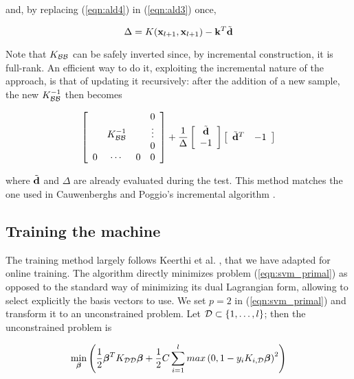 \noindent and, by replacing (\ref{eqn:ald4}) in (\ref{eqn:ald3}) once,

\begin{equation} \label{eqn:ald5}
  \Delta = K(\mathbf{x}_{l+1},\mathbf{x}_{l+1}) - \mathbf{k}^T \tilde{\mathbf{d}}
\end{equation}

Note that $K_{\mathcal{B}\mathcal{B}}$ can be safely inverted since, by incremental
construction, it is full-rank. An efficient way to do it, exploiting
the incremental nature of the approach, is that of updating it
recursively: after the addition of a new sample, the new
$K_{\mathcal{B}\mathcal{B}}^{-1}$ then becomes

\begin{equation} \label{eqn:inv_upd}
  \left[\begin{array}{cccc}
       &               &   & 0 \\
       & K_{\mathcal{B}\mathcal{B}}^{-1} &   & \vdots \\
       &               &   & 0 \\
     0 &       \cdots  & 0 & 0
  \end{array}\right]
  +
  \frac{1}{\Delta}
  \left[\begin{array}{c}
    \tilde{\mathbf{d}} \\
    -1
  \end{array}\right]
  \left[\begin{array}{cc}
    \tilde{\mathbf{d}}^T & -1
  \end{array}\right]
\end{equation}

\noindent where $\tilde{\mathbf{d}}$ and $\Delta$ are already evaluated during the
test. This method matches the one used in Cauwenberghs and Poggio's
incremental algorithm \cite{CauwenberghsP00}.

\subsection{Training the machine}

The training method largely follows Keerthi et
al. \cite{KeerthiDC05,KeerthiCDC06}, that we have adapted for online
training. The algorithm directly minimizes problem
(\ref{eqn:svm_primal}) as opposed to the standard way of minimizing
its dual Lagrangian form, allowing to select explicitly the basis
vectors to use. We set $p=2$ in (\ref{eqn:svm_primal}) and transform
it to an unconstrained problem.  Let $\mathcal{D} \subset \{1,\ldots,l\}$; then
the unconstrained problem is

\begin{equation} \label{eqn:primal}
  \min_{\boldsymbol{\beta}} \left( 
      \frac{1}{2} \boldsymbol{\beta}^T K_{\mathcal{D}\mathcal{D}} \boldsymbol{\beta}
    + \frac{1}{2} C \sum_{i=1}^l max \left(0,1-y_i K_{i,\mathcal{D}} \boldsymbol{\beta} \right)^2
  \right)
\end{equation}

